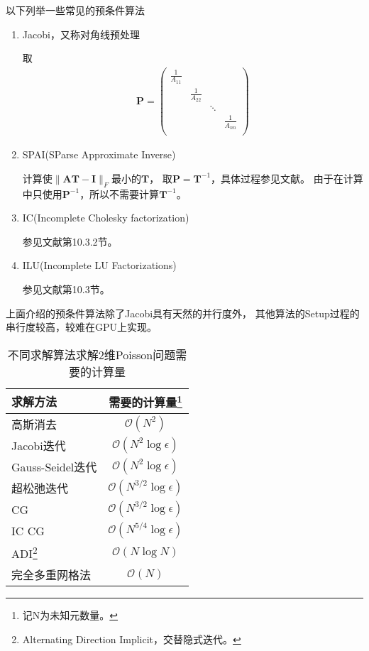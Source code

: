 以下列举一些常见的预条件算法
\begin{enumerate}
\item Jacobi，又称对角线预处理

取\cite{saad2003iterative}
\begin{align}
  \bm{P}=\begin{pmatrix}
  \displaystyle \frac{1}{A_{11}} & & &\\
  & \displaystyle \frac{1}{A_{22}} & &\\
  & & \ddots &\\
  & & & \displaystyle \frac{1}{A_{nn}}\\
  \end{pmatrix}
\end{align}

\item SPAI(SParse Approximate Inverse)\cite{saad2003iterative}

计算使$\|\bm{AT}-\bm{I}\|_F$最小的$\bm{T}$，
取$\bm{P}=\bm{T}^{-1}$，具体过程参见文献。
由于在计算中只使用$\bm{P}^{-1}$，所以不需要计算$\bm{T}^{-1}$。

\item IC(Incomplete Cholesky factorization)

参见文献第10.3.2节。

\item ILU(Incomplete LU Factorizations)

参见文献第10.3节。

\end{enumerate}
上面介绍的预条件算法除了Jacobi具有天然的并行度外，
其他算法的Setup过程的串行度较高，较难在GPU上实现。



\begin{table}
\centering
\caption{不同求解算法求解2维Poisson问题需要的计算量\cite{trottenberg2000multigrid}}
\begin{minipage}{.7\linewidth}
\centering
\begin{tabular}{lc}
\toprule
求解方法 & 需要的计算量\footnote{记N为未知元数量。}\\
\midrule
高斯消去 & $\mathcal{O}(N^2)$\\
Jacobi迭代 & $\mathcal{O}(N^2\log\epsilon)$\\
Gauss-Seidel迭代 & $\mathcal{O}(N^2\log\epsilon)$\\
超松弛迭代 & $\mathcal{O}(N^{3/2}\log\epsilon)$\\
CG & $\mathcal{O}(N^{3/2}\log\epsilon)$\\
IC CG & $\mathcal{O}(N^{5/4}\log\epsilon)$\\
ADI\footnote{Alternating Direction Implicit，交替隐式迭代。} & $\mathcal{O}(N\log N)$\\
完全多重网格法 & $\mathcal{O}(N)$\\
\bottomrule
\end{tabular}
\end{minipage}
\end{table}


